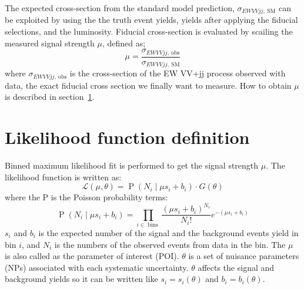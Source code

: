 The expected cross-section from the standard model prediction, $\sigma_{EW VVjj \mathrm{, \ SM}}$ can be exploited by using the the truth event yields, yields after applying the fiducial selections, and the luminosity.
Fiducial cross-section is evaluated by scailing the measured signal strength $\mu$, defined as;
\begin{equation}
\mu = \frac{\sigma_{EW VVjj \mathrm{, \ obs}}}{\sigma_{EW VVjj \mathrm{, \ SM}}}
\end{equation}
where $\sigma_{EW VVjj \mathrm{, \ obs}}$ is the cross-section of the EW VV+jj process observed with data, the exact fiducial cross section we finally want to measure.
How to obtain $\mu$ is described in section~\ref{sec:likelihood}.

\section{Likelihood function definition}
\label{sec:likelihood}
Binned maximum likelihood fit is performed to get the signal strength $\mu$. 
The likelihood function is written as:
\begin{equation}
\label{eq:poisson}
\mathcal{L}(\mu, \theta) = \operatorname{P}\left(N_{i} \mid \mu s_{i}+b_{i}\right) \cdot G(\theta) 
\end{equation}
where the P is the Poisson probability terms:
\begin{equation}
\operatorname{P}\left(N_{i} \mid \mu s_{i}+b_{i}\right) = \prod_{i \in \text { bins }} \frac{\left(\mu s_{i}+b_{i}\right)^{N_{i}}}{N_{i} !} e^{-\left(\mu s_{i}+b_{i}\right)} 
\end{equation}
$s_i$ and $b_i$ is the expected number of the signal and the background events yield in bin $i$, and $N_i$ is the numbers of the observed events from data in the bin. 
The $\mu$ is also called as the parameter of interest (POI). $\theta$ is a set of nuisance parameters (NPs) associated with each systematic uncertainty. $\theta$ affects the signal and background yields so it can be written like $s_{i}=s_{i}(\theta)$ and $b_{i}=b_{i}(\theta)$. 
